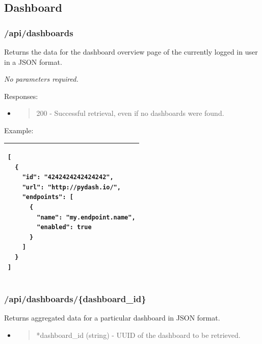 \hypertarget{dashboard}{%
\subsection{Dashboard}\label{dashboard}}

\hypertarget{apidashboards}{%
\subsubsection{/api/dashboards}\label{apidashboards}}

Returns the data for the dashboard overview page of the currently logged
in user in a JSON format.

\emph{No parameters required.}

Responses:

\begin{itemize}
\item
  \begin{quote}
  200 - Successful retrieval, even if no dashboards were found.
  \end{quote}
\end{itemize}

Example:

\begin{longtable}[]{@{}l@{}}
\toprule
\endhead
\begin{minipage}[t]{0.97\columnwidth}\raggedright
\begin{lstlisting}
[
  {
    "id": "4242424242424242",
    "url": "http://pydash.io/",
    "endpoints": [
      {
        "name": "my.endpoint.name",
        "enabled": true
      }
    ]
  }
]

\end{lstlisting}\strut
\end{minipage}\tabularnewline
\bottomrule
\end{longtable}

\hypertarget{apidashboardsdashboard_id}{%
\subsubsection{/api/dashboards/\{dashboard\_id\}}\label{apidashboardsdashboard_id}}

Returns aggregated data for a particular dashboard in JSON format.

\begin{itemize}
\item
  \begin{quote}
  *dashboard\_id (string) - UUID of the dashboard to be retrieved.
  \end{quote}
\end{itemize}

